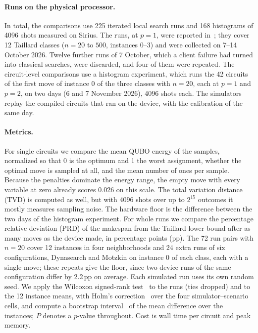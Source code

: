 \documentclass{scspaperproc}
\begin{document}
\paragraph{Runs on the physical processor.}
In total, the comparisons use 225 iterated local search runs and 168
histograms of 4096 shots measured on Sirius. The runs, at $p = 1$, were
reported in~\cite{anon2026b}; they cover 12 Taillard classes
($n = 20$ to $500$, instances 0--3) and were collected on 7--14 October 2026. Twelve
further runs of 7 October, which a client failure had turned into classical
searches, were discarded, and four of them were repeated. The circuit-level
comparisons use a histogram experiment, which runs the 42 circuits of the
first move of instance 0 of the three classes with $n = 20$, each at $p = 1$
and $p = 2$, on two days (6 and 7 November 2026), 4096 shots each. The simulators
replay the compiled circuits that ran on the device, with the calibration of
the same day.

\paragraph{Metrics.}
For single circuits we compare the mean QUBO energy of the samples, normalized
so that 0 is the optimum and 1 the worst assignment, whether the optimal move
is sampled at all, and the mean number of ones per sample. Because the
penalties dominate the energy range, the empty move with every variable at
zero already scores 0.026 on this scale. The total variation distance (TVD)
is computed as well, but with 4096 shots over up to $2^{15}$ outcomes it
mostly measures sampling noise. The hardware floor is the difference between
the two days of the histogram experiment. For whole runs we compare the percentage relative
deviation (PRD) of the makespan from the Taillard lower bound after as many
moves as the device made, in percentage points (pp). The 72 run pairs with
$n = 20$ cover 12 instances in four neighborhoods and 24 extra runs of six
configurations, Dynasearch and Motzkin on instance 0 of each class, each
with a single move; these repeats give the floor, since two device runs of
the same configuration differ by 2.2\,pp on average. Each simulated run uses
its own random seed. We apply the Wilcoxon signed-rank
test~\cite{wilcoxon1945} to the runs (ties dropped) and to the 12 instance
means, with Holm's correction~\cite{holm1979} over the four
simulator--scenario cells, and compute a bootstrap interval~\cite{efron1993bootstrap}
of the mean difference over the instances; $P$ denotes a $p$-value throughout. Cost is
wall time per circuit and peak memory.
\end{document}
